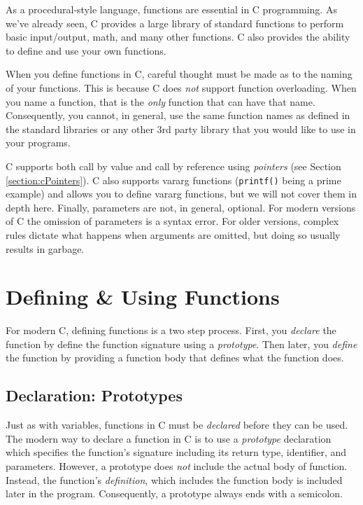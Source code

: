 

As a procedural-style language, functions are essential in C 
programming.  As we've already seen, C provides a large
library of standard functions to perform basic input/output, 
math, and many other functions.  C also provides the ability 
to define and use your own functions.

When you define functions in C, careful thought must be 
made as to the naming of your functions.  This is because
C does \emph{not} support function overloading.  When you
name a function, that is the \emph{only} function that can
have that name.  Consequently, you cannot, in general,
use the same function names as defined in the standard 
libraries or any other 3rd party library that you would like
to use in your programs.

C supports both call by value and call by reference using
\emph{pointers} (see Section \ref{section:cPointers}).  C
also supports vararg functions (\texttt{printf()} being
a prime example) and allows you to define vararg functions, 
but we will not cover them in depth here.  Finally, 
parameters are not, in general, optional.  For modern 
versions of C the omission of parameters is a syntax error.
For older versions, complex rules dictate what happens
when arguments are omitted, but doing so usually results
in garbage.

\section{Defining \& Using Functions}

For modern C, defining functions is a two step process.  First,
you \emph{declare} the function by define the function signature 
using a \emph{prototype}.  Then later, you \emph{define} the
function by providing a function body that defines what the
function does.

\subsection{Declaration: Prototypes}

Just as with variables, functions in C must be \emph{declared} before
they can be used.  The modern way to declare a function in C is to
use a \emph{prototype} declaration which specifies the function's
signature including its return type, identifier, and parameters.  However,
a prototype does \emph{not} include the actual body of function. 
Instead, the function's \emph{definition}, which includes the function body is
included later in the program.  Consequently, a prototype always 
ends with a semicolon.  

